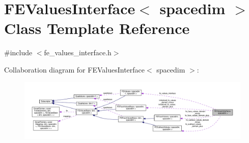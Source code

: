 \hypertarget{class_f_e_values_interface}{}\section{F\+E\+Values\+Interface$<$ spacedim $>$ Class Template Reference}
\label{class_f_e_values_interface}


{\ttfamily \#include $<$fe\+\_\+values\+\_\+interface.\+h$>$}



Collaboration diagram for F\+E\+Values\+Interface$<$ spacedim $>$\+:
\nopagebreak
\begin{figure}[H]
\begin{center}
\leavevmode
\includegraphics[width=350pt]{class_f_e_values_interface__coll__graph}
\end{center}
\end{figure}
